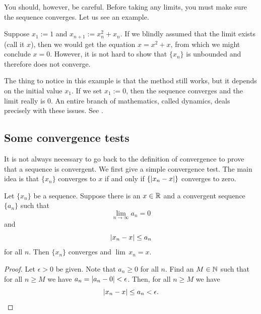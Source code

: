 You should, however, be careful.  Before taking any limits, you must
make sure the sequence converges.  Let us see an example.

\begin{example}
Suppose $x_1 := 1$ and $x_{n+1} := x_n^2+x_n$.
If we blindly assumed that the limit exists (call it $x$), then we
would get the equation $x = x^2+x$, from which we might
conclude $x=0$.  However, it is not hard
to show that $\{ x_n \}$ is unbounded and therefore does not converge.

The thing to notice in this example is that the method still works, but
it depends on the initial value $x_1$.  If we set $x_1 := 0$,
then the sequence converges and the limit really is 0.
An entire branch of mathematics, called dynamics, deals precisely with these
issues.
See
.
\end{example}

\subsection{Some convergence tests}

It is not always necessary to go back to the definition of convergence
to prove that a sequence is convergent.  We first give a simple convergence test.
The main idea is that 
$\{ x_n \}$ converges to $x$ if and only if 
$\{ \left\lvert { x_n - x } \right\rvert \}$ converges to zero.

\begin{prop} \label{convzero:prop}
Let $\{ x_n \}$ be a sequence. 
Suppose there is an $x \in {\mathbb{R}}$
and a convergent sequence $\{ a_n \}$
such that
\begin{equation*}
\lim_{n\to\infty} a_n = 0
\end{equation*}
and 
\begin{equation*}
\left\lvert {x_n - x} \right\rvert \leq a_n
\end{equation*}
for all $n$.  Then $\{ x_n \}$ converges and $\lim\, x_n = x$.
\end{prop}

\begin{proof}
Let $\epsilon > 0$ be given.  Note that $a_n \geq 0$
for all $n$.  Find an $M \in {\mathbb{N}}$ such that for
all $n \geq M$ we have
$a_n = \left\lvert {a_n - 0} \right\rvert < \epsilon$.  Then, for all $n \geq M$
we have
\begin{equation*}
\left\lvert {x_n - x} \right\rvert \leq a_n < \epsilon . \qedhere
\end{equation*}
\end{proof}


